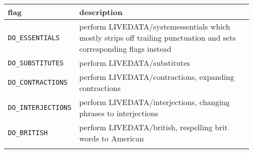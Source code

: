 \documentclass[]{article}
\begin{document}
\begin{longtable}[]{@{}ll@{}}
\toprule
\begin{minipage}[b]{0.07\columnwidth}\raggedright\strut
flag\strut
\end{minipage} & \begin{minipage}[b]{0.10\columnwidth}\raggedright\strut
description\strut
\end{minipage}\tabularnewline
\midrule
\endhead
\begin{minipage}[t]{0.07\columnwidth}\raggedright\strut
\texttt{DO\_ESSENTIALS}\strut
\end{minipage} & \begin{minipage}[t]{0.10\columnwidth}\raggedright\strut
perform LIVEDATA/systemessentials which mostly strips off trailing
punctuation and sets corresponding flags instead\strut
\end{minipage}\tabularnewline
\begin{minipage}[t]{0.07\columnwidth}\raggedright\strut
\texttt{DO\_SUBSTITUTES}\strut
\end{minipage} & \begin{minipage}[t]{0.10\columnwidth}\raggedright\strut
perform LIVEDATA/substitutes\strut
\end{minipage}\tabularnewline
\begin{minipage}[t]{0.07\columnwidth}\raggedright\strut
\texttt{DO\_CONTRACTIONS}\strut
\end{minipage} & \begin{minipage}[t]{0.10\columnwidth}\raggedright\strut
perform LIVEDATA/contractions, expanding contractions\strut
\end{minipage}\tabularnewline
\begin{minipage}[t]{0.07\columnwidth}\raggedright\strut
\texttt{DO\_INTERJECTIONS}\strut
\end{minipage} & \begin{minipage}[t]{0.10\columnwidth}\raggedright\strut
perform LIVEDATA/interjections, changing phrases to interjections\strut
\end{minipage}\tabularnewline
\begin{minipage}[t]{0.07\columnwidth}\raggedright\strut
\texttt{DO\_BRITISH}\strut
\end{minipage} & \begin{minipage}[t]{0.10\columnwidth}\raggedright\strut
perform LIVEDATA/british, respelling brit words to American\strut
\end{minipage}\tabularnewline
\begin{minipage}[t]{0.07\columnwidth}\raggedright\strut

\end{minipage}
\end{longtable}
\end{document}
